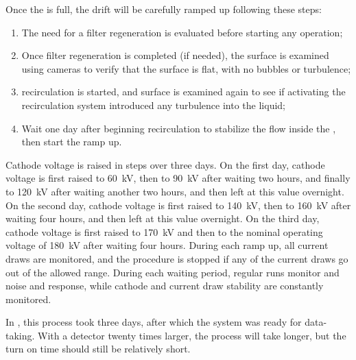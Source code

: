 Once the  is full, the drift  will be carefully ramped up following these steps:

\begin{enumerate}

    \item The need for a filter regeneration is evaluated before starting any operation;

    \item Once filter regeneration is completed (if needed), the  surface is examined using cameras to verify that the surface is flat, with no bubbles or turbulence;
    
    \item {} recirculation is started, and  surface is examined again to see if activating the recirculation system introduced any turbulence into the liquid;
    
    \item Wait one day after beginning  recirculation to stabilize the  flow inside the , then start the  ramp up.
    
\end{enumerate}

Cathode voltage is raised in steps over three days. 
On the first day, cathode voltage is first raised to \SI{60}{kV}, then to \SI{90}{kV} after waiting two hours, and finally to \SI{120}{kV} after waiting another two hours, and then left at this value overnight.
On the second day, cathode voltage is first raised to \SI{140}{kV}, then to \SI{160}{kV} after waiting four hours, and then left at this value overnight. 
On the third day, cathode voltage is first raised to \SI{170}{kV} and then to the nominal operating voltage of \SI{180}{kV} after waiting four hours. 
During each  ramp up, all  current draws are monitored, and the procedure is stopped if any of the current draws go out of the allowed range. 
During each waiting period, regular  runs monitor  and  noise and response, while cathode  and current draw stability are constantly monitored.

In , this process took three days, after which the system was  ready for data-taking. With a detector twenty times larger, the process will take longer, but the turn on time should still be relatively short. 